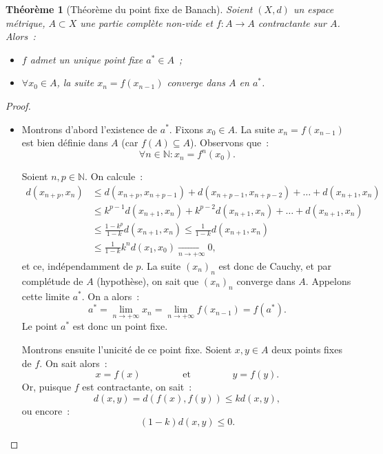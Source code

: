 \documentclass{report}
\newtheorem{thm}{Théorème}[chapter]
\theoremstyle{definition}
\theoremstyle{remark}
\numberwithin{equation}{section}
\newcommand{\N}{\mathbb N}
\newcommand{\pinfty}{{+\infty}}
\begin{document}
			\begin{thm}[Théorème du point fixe de Banach] Soient $(X, d)$ un espace métrique, $A \subset X$ une partie complète non-vide et $f : A \to A$
			contractante sur $A$. Alors~:
			\begin{itemize}
				\item $f$ admet un unique point fixe $a^* \in A$~;
				\item $\forall x_0 \in A$, la suite $x_n = f(x_{n-1})$ converge dans $A$ en $a^*$.
			\end{itemize}
			\end{thm}

			\begin{proof}~
			\begin{itemize}
				\item Montrons d'abord l'existence de $a^*$. Fixons $x_0 \in A$.  La suite $x_n = f(x_{n-1})$ est bien définie dans $A$ (car $f(A) \subseteq A$).
				Observons que~:
				\begin{equation}
					\forall n \in \N : x_n = f^n(x_0).
				\end{equation}

				Soient $n, p \in \N$. On calcule~:
				\begin{align}
					d(x_{n+p}, x_n) &\leq d(x_{n+p}, x_{n+p-1}) + d(x_{n+p-1}, x_{n+p-2}) + \ldots + d(x_{n+1}, x_n) \\
					&\leq k^{p-1}d(x_{n+1}, x_n) + k^{p-2}d(x_{n+1}, x_n) + \ldots + d(x_{n+1}, x_n) \\
					&\leq \frac {1-k^p}{1-k}d(x_{n+1}, x_n) \leq \frac 1{1-k}d(x_{n+1}, x_n) \\
					&\leq \frac 1{1-k}k^nd(x_1, x_0) \xrightarrow[n \to \pinfty]{} 0,
				\end{align}
				et ce, indépendamment de $p$. La suite $(x_n)_n$ est donc de Cauchy, et par complétude de $A$ (hypothèse), on sait que $(x_n)_n$ converge dans $A$.
				Appelons cette limite $a^*$. On a alors~:
				\begin{equation}
					a^* = \lim_{n \to \pinfty} x_n = \lim_{n \to \pinfty}f(x_{n-1}) = f(a^*).
				\end{equation}
				Le point $a^*$ est donc un point fixe.

				Montrons ensuite l'unicité de ce point fixe. Soient $x, y \in A$ deux points fixes de $f$. On sait alors~:
				\begin{equation}
					x = f(x) \qquad\qquad \text{ et } \qquad\qquad y = f(y).
				\end{equation}
				Or, puisque $f$ est contractante, on sait~:
				\begin{equation}
					d(x, y) = d(f(x), f(y)) \leq kd(x, y),
				\end{equation}
				ou encore~:
				\begin{equation}
					(1-k)d(x, y) \leq 0.
				\end{equation}


\end{itemize}
\end{proof}
\end{document}

